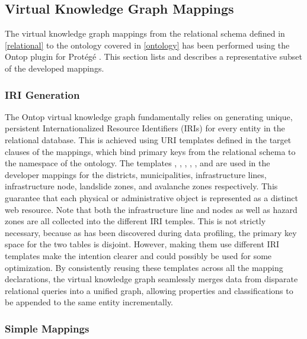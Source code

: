
\subsection{Virtual Knowledge Graph Mappings} \label{mappings}

The virtual knowledge graph mappings from the relational schema defined in \cref{relational} to the ontology covered in \cref{ontology} has been performed using the Ontop plugin for Protégé \cite{calvanese2016ontop}. This section lists and describes a representative subset of the developed mappings.

\subsubsection{IRI Generation}

The Ontop virtual knowledge graph fundamentally relies on generating unique, persistent Internationalized Resource Identifiers (IRIs) for every entity in the relational database. This is achieved using URI templates defined in the target clauses of the mappings, which bind primary keys from the relational schema to the namespace of the ontology. The templates , , , , , and  are used in the developer mappings for the districts, municipalities, infrastructure lines, infrastructure node, landslide zones, and avalanche zones respectively. This guarantee that each physical or administrative object is represented as a distinct web resource. Note that both the infrastructure line and nodes as well as hazard zones are all collected into the different IRI temples. This is not strictly necessary, because as has been discovered during data profiling, the primary key space for the two tables is disjoint. However, making them use different IRI templates make the intention clearer and could possibly be used for some optimization. By consistently reusing these templates across all the mapping declarations, the virtual knowledge graph seamlessly merges data from disparate relational queries into a unified graph, allowing properties and classifications to be appended to the same entity incrementally.


\subsubsection{Simple Mappings}

